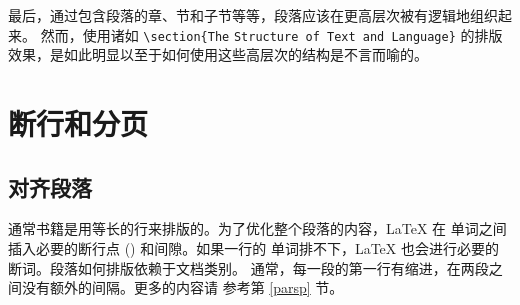最后，通过包含段落的章、节和子节等等，段落应该在更高层次被有逻辑地组织起来。
然而，使用诸如 \verb|\section{The| \texttt{Structure of Text and
Language}\verb|}| 的排版效果，是如此明显以至于如何使用这些高层次的结构是不言而喻的。


%
\section{断行和分页}

\subsection{对齐段落}

通常书籍是用等长的行来排版的。为了优化整个段落的内容，\LaTeX{} 在
单词之间插入必要的断行点 () 和间隙。如果一行的
单词排不下，\LaTeX{} 也会进行必要的断词。段落如何排版依赖于文档类别。
通常，每一段的第一行有缩进，在两段之间没有额外的间隔。更多的内容请
参考第 \ref{parsp} 节。

